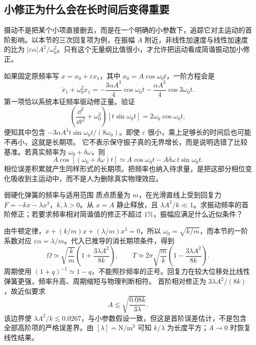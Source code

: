 \subsection{小修正为什么会在长时间后变得重要}
摄动不是把某个小项直接删去，而是在一个明确的小参数下，追踪它对主运动的首阶影响。以本节的三次回复项为例，在振幅 $A$ 附近，非线性加速度与线性加速度的比为 $|\varepsilon\alpha|A^2/\omega_0^2$。只有这个无量纲比值很小，才允许把运动看成简谐振动加小修正。

如果固定原频率写 $x=x_0+\varepsilon x_1$，其中 $x_0=A\cos\omega_0t$，一阶方程会是
\[
 \ddot x_1+\omega_0^2x_1
 =-\frac{3\alpha A^3}{4}\cos\omega_0t
  -\frac{\alpha A^3}{4}\cos3\omega_0t.
\]
第一项恰以系统本征频率驱动修正量。验证
\[
 \left(\frac{\dd^2}{\dd t^2}+\omega_0^2\right)
 [t\sin\omega_0t]=2\omega_0\cos\omega_0t,
\]
便知其中包含 $-3\alpha A^3t\sin\omega_0t/(8\omega_0)$。即使 $\varepsilon$ 很小，乘上足够长的时间后也可能不再小，这就是长期项。
它不表示保守振子真的无界增长，而是说明选错了比较基准。若真实频率为 $\omega_0+\delta\omega$，则
\[
 A\cos[(\omega_0+\delta\omega)t]
 \simeq A\cos\omega_0t-A\delta\omega\,t\sin\omega_0t.
\]
相位误差积累就产生同样形式的长期项。把频率也纳入待求量，是把这部分相位变化吸收到主运动中，而不是人为删除真实物理效应。

\begin{origexamplebox}{弱硬化弹簧的频率与适用范围}\label{ch10:ex:teaching-hardening}
质点质量为 $m$，在光滑直线上受到回复力 $F=-kx-\lambda x^3$，$k,\lambda>0$。从 $x=A$ 静止释放，且 $\lambda A^2/k\ll1$。求振动频率的首阶修正；若要求频率相对简谐值的修正不超过 $1\%$，振幅应满足什么近似条件？

\ThQHardening
\end{origexamplebox}
\begin{xesolution}
\ThAHardening

由牛顿定律，$\ddot x+(k/m)x+(\lambda/m)x^3=0$，所以 $\omega_0=\sqrt{k/m}$，而本节的一阶系数对应 $\varepsilon\alpha=\lambda/m$。代入已推导的消长期项条件，得到
\[
 \Omega\simeq\sqrt{\frac km}\left(1+\frac{3\lambda A^2}{8k}\right),
 \qquad T\simeq2\pi\sqrt{\frac mk}\left(1-\frac{3\lambda A^2}{8k}\right).
\]
周期使用 $(1+q)^{-1}\simeq1-q$，不能照抄频率的正号。回复力在较大位移处比线性弹簧更强，频率升高、周期缩短与物理判断相符。
首阶相对修正为 $3\lambda A^2/(8k)$，故近似要求
\[
 A\lesssim\sqrt{\frac{0.08k}{3\lambda}}.
\]
该边界使 $\lambda A^2/k\lesssim0.0267$，与小参数假设一致，但这是首阶误差估计，不是包含全部高阶项的严格误差界。由 $[\lambda]=\mathrm{N/m^3}$ 可知 $k/\lambda$ 为长度平方；$A\to0$ 时恢复线性结果。
\end{xesolution}

